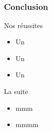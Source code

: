 


\subsection{} %

\speaker{\Pierre}
\begin{frame}
\frametitle{Conclusion}
\begin{block}{Nos réussites}
	\begin{itemize}
		\item Un
		\item Un
		\item Un
	\end{itemize}
\end{block}
	
\begin{block}{La suite}
	\begin{itemize}
		\item mmm
		\item mmmm
	\end{itemize}
\end{block}
\end{frame}
